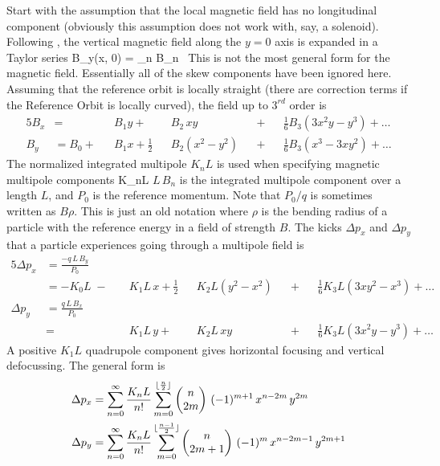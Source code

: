 Start with the assumption that the local magnetic field has no
longitudinal component (obviously this assumption does not work with,
say, a solenoid).  Following \mad, the vertical magnetic field along
the $y = 0$ axis is expanded in a Taylor series
\Begineq
  B_y(x, 0) = \sum_n B_n \, 
  \label{byx0b}
\Endeq
This is not the most
general form for the magnetic field. Essentially all of the skew
components have been ignored here. Assuming that the
reference orbit is locally straight (there are correction terms if the
Reference Orbit is locally curved), the field up to $3^{rd}$ order is
\begin{alignat}{5}
  B_x &=           &&B_1 y \plus         &&B_2 \, xy       
                   && \plus && \frac{1}{6} B_3 (3x^2 y - y^3) \plus \ldots \\
  B_y &= B_0 \plus &&B_1 x + \frac{1}{2} &&B_2 (x^2 - y^2) 
                   && \plus && \frac{1}{6} B_3 (x^3 - 3x y^2) \plus \ldots
\end{alignat}
The normalized integrated multipole $K_nL$ is used when specifying magnetic
multipole components
\Begineq
  K_nL \equiv {}
\Endeq
$L \, B_n$ is the integrated multipole component over a length $L$,
and $P_0$ is the reference momentum. Note that $P_0/q$ is sometimes
written as $B\rho$. This is just an old notation where $\rho$ is the
bending radius of a particle with the reference energy in a field of
strength $B$. The kicks $\Delta p_x$ and $\Delta p_y$ that a
particle experiences going through a multipole field is
\begin{alignat}{5}
  \Delta p_x & = \frac{-q \, L \, B_y}{P_0} \label{pqlbp1} \\
             & = -K_0 L \;-\; 
             && K_1 L \, x \plus 
             \frac{1}{2} && K_2 L (y^2 - x^2) && \plus 
             && \frac{1}{6} K_3 L (3x y^2 - x^3) \plus \ldots 
             \nonumber \\
  \Delta p_y & = \frac{q \, L \, B_x}{P_0} \label{pqlbp2} \\
             & =     
             && K_1 L \, y \plus 
             && K_2 L \, xy && \plus 
             && \frac{1}{6} K_3L (3x^2 y - y^3) \plus \ldots \nonumber 
\end{alignat}
A positive $K_1L$ quadrupole component gives
horizontal focusing and vertical defocussing. The general form is
\begin{align}
  \Delta p_x &= \sum_{n = 0}^{\infty} \frac{K_n L}{n!} 
             \sum_{m = 0}^{\lfloor \frac{n}{2} \rfloor}
             \begin{pmatrix} n \cr 2m \end{pmatrix} \,
             (-1)^{m+1} \, x^{n-2m} \, y^{2m} \\
  \Delta p_y &= \sum_{n = 0}^{\infty} \frac{K_n L}{n!} 
             \sum_{m = 0}^{\lfloor \frac{n-1}{2} \rfloor}
             \begin{pmatrix} n \cr 2m+1 \end{pmatrix} \,
             (-1)^{m} \, x^{n-2m-1} \, y^{2m+1}
\end{align}

